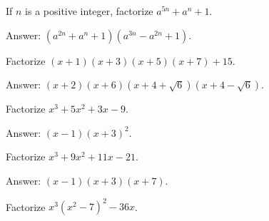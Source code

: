 \begin{tcolorbox}
\begin{question}
If $n$ is a positive integer, factorize $a^{5n}+a^n+1$.
\end{question}
\end{tcolorbox}

\begin{solution}[name=Solution by Parviz Shahriari]
Answer: $(a^{2n}+a^n+1)(a^{3n}-a^{2n}+1)$.
\end{solution}




\begin{tcolorbox}
\begin{question}
Factorize $(x+1)(x+3)(x+5)(x+7)+15$.
\end{question}
\end{tcolorbox}

\begin{solution}[name=Solution by Parviz Shahriari]
Answer: $(x+2)(x+6)(x+4+\sqrt{6})(x+4-\sqrt{6})$.
\end{solution}

\begin{tcolorbox}
\begin{question}
Factorize $x^3+5x^2+3x-9$.
\end{question}
\end{tcolorbox}

\begin{solution}[name=Solution by Parviz Shahriari]
Answer: $(x-1)(x+3)^2$.
\end{solution}


\begin{tcolorbox}
\begin{question}
Factorize $x^3+9x^2+11x-21$.
\end{question}
\end{tcolorbox}

\begin{solution}[name=Solution by Parviz Shahriari]
Answer: $(x-1)(x+3)(x+7)$.
\end{solution}


\begin{tcolorbox}
\begin{question}
Factorize $x^3(x^2-7)^2-36x$.
\end{question}
\end{tcolorbox}

